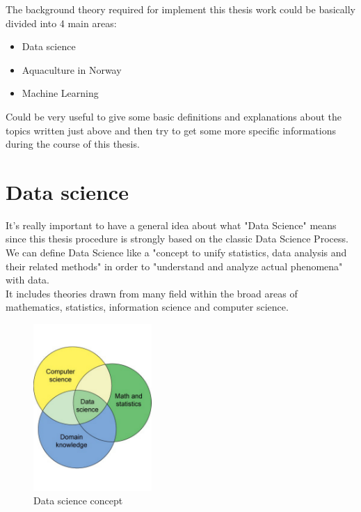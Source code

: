 

The background theory required for implement this thesis work could be basically divided into 4 main areas:
\begin{itemize}
\item Data science
\item Aquaculture in Norway
\item Machine Learning
\end{itemize}

Could be very useful to give some basic definitions and explanations about the topics written just above and then try to get some more specific informations during the course of this thesis.

\newpage
\section{Data science}
It's really important to have a general idea about what "Data Science" means since this thesis procedure is strongly based on the classic Data Science Process.\\
We can define Data Science like a "concept to unify statistics, data analysis and their related methods" in order to "understand and analyze actual phenomena" with data.\\
It includes theories drawn from many field within the broad areas of mathematics, statistics, information science and computer science.

\begin{figure}[H]
	\centering
    \includegraphics[trim={0 3cm 0 3cm},clip,width=0.4\textwidth]{Files/Data_Science_Concept.pdf}
    \caption{Data science concept}
    \label{fig: Data_science}
\end{figure}



